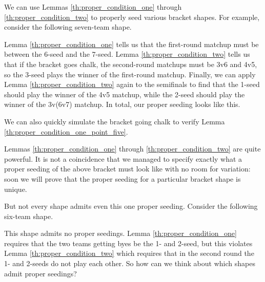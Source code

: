 {    We can use Lemmas \ref{th:proper_condition_one} through \ref{th:proper_condition_two} to properly seed various bracket shapes. For example, consider the following seven-team shape.


    Lemma \ref{th:proper_condition_one} tells us that the first-round matchup must be between the 6-seed and the 7-seed. Lemma \ref{th:proper_condition_two} tells us that if the bracket goes chalk, the second-round matchups must be 3v6 and 4v5, so the 3-seed plays the winner of the first-round matchup. Finally, we can apply Lemma \ref{th:proper_condition_two} again to the semifinals to find that the 1-seed should play the winner of the 4v5 matchup, while the 2-seed should play the winner of the 3v(6v7) matchup. In total, our proper seeding looks like this.


    We can also quickly simulate the bracket going chalk to verify Lemma \ref{th:proper_condition_one_point_five}.

    Lemmas \ref{th:proper_condition_one} through \ref{th:proper_condition_two} are quite powerful. It is not a coincidence that we managed to specify exactly what a proper seeding of the above bracket must look like with no room for variation: soon we will prove that the proper seeding for a particular bracket shape is unique. 

    But not every shape admits even this one proper seeding. Consider the following six-team shape.


    This shape admits no proper seedings. Lemma \ref{th:proper_condition_one} requires that the two teams getting byes be the 1- and 2-seed, but this violates Lemma \ref{th:proper_condition_two} which requires that in the second round the 1- and 2-seeds do not play each other. So how can we think about which shapes admit proper seedings?

    }
